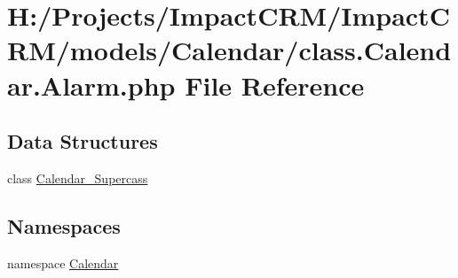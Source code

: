 \hypertarget{class_8Calendar_8Alarm_8php}{
\section{H:/Projects/ImpactCRM/ImpactCRM/models/Calendar/class.Calendar.Alarm.php File Reference}
\label{class_8Calendar_8Alarm_8php}
}
\subsection*{Data Structures}
\begin{DoxyCompactItemize}
\item 
class \hyperlink{classCalendar__Supercass}{Calendar\_\-Supercass}
\end{DoxyCompactItemize}
\subsection*{Namespaces}
\begin{DoxyCompactItemize}
\item 
namespace \hyperlink{namespaceCalendar}{Calendar}
\end{DoxyCompactItemize}
